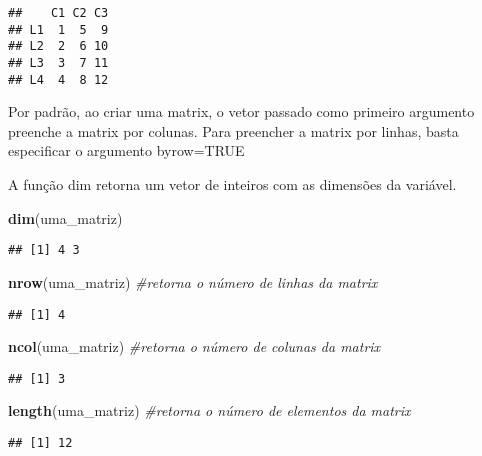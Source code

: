 \documentclass[]{book}
\newenvironment{Shaded}{\begin{snugshade}}{\end{snugshade}}
\newcommand{\CommentTok}[1]{\textcolor[rgb]{0.56,0.35,0.01}{\textit{#1}}}
\newcommand{\KeywordTok}[1]{\textcolor[rgb]{0.13,0.29,0.53}{\textbf{#1}}}
\newcommand{\NormalTok}[1]{#1}
\theoremstyle{definition}
\theoremstyle{definition}
\theoremstyle{definition}
\theoremstyle{remark}
\begin{document}
\begin{verbatim}
##    C1 C2 C3
## L1  1  5  9
## L2  2  6 10
## L3  3  7 11
## L4  4  8 12
\end{verbatim}

Por padrão, ao criar uma matrix, o vetor passado como primeiro argumento preenche a matrix por colunas.
Para preencher a matrix por linhas, basta especificar o argumento byrow=TRUE

A função dim retorna um vetor de inteiros com as dimensões da variável.

\begin{Shaded}
\begin{Highlighting}[]
\KeywordTok{dim}\NormalTok{(uma_matriz)}
\end{Highlighting}
\end{Shaded}

\begin{verbatim}
## [1] 4 3
\end{verbatim}

\begin{Shaded}
\begin{Highlighting}[]
\KeywordTok{nrow}\NormalTok{(uma_matriz) }\CommentTok{#retorna o número de linhas da matrix}
\end{Highlighting}
\end{Shaded}

\begin{verbatim}
## [1] 4
\end{verbatim}

\begin{Shaded}
\begin{Highlighting}[]
\KeywordTok{ncol}\NormalTok{(uma_matriz) }\CommentTok{#retorna o número de colunas da matrix}
\end{Highlighting}
\end{Shaded}

\begin{verbatim}
## [1] 3
\end{verbatim}

\begin{Shaded}
\begin{Highlighting}[]
\KeywordTok{length}\NormalTok{(uma_matriz) }\CommentTok{#retorna o número de elementos da matrix}
\end{Highlighting}
\end{Shaded}

\begin{verbatim}
## [1] 12
\end{verbatim}
\end{document}
